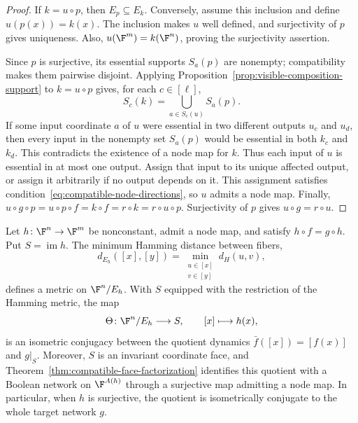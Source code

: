 \begin{proof}
If $k=u\circ p$, then $E_p\subseteq E_k$. Conversely, assume this inclusion and define $u(p(x))=k(x)$. The inclusion makes $u$ well defined, and surjectivity of $p$ gives uniqueness. Also, $u(\F^m)=k(\F^n)$, proving the surjectivity assertion.

Since $p$ is surjective, its essential supports $S_a(p)$ are nonempty; compatibility makes them pairwise disjoint. Applying Proposition~\ref{prop:visible-composition-support} to $k=u\circ p$ gives, for each $c\in[\ell]$,
\[
    S_c(k)=\bigcup_{a\in S_c(u)}S_a(p).
\]
If some input coordinate $a$ of $u$ were essential in two different outputs $u_c$ and $u_d$, then every input in the nonempty set $S_a(p)$ would be essential in both $k_c$ and $k_d$. This contradicts the existence of a node map for $k$. Thus each input of $u$ is essential in at most one output. Assign that input to its unique affected output, or assign it arbitrarily if no output depends on it. This assignment satisfies condition~\eqref{eq:compatible-node-directions}, so $u$ admits a node map.
Finally, $u\circ g\circ p=u\circ p\circ f=k\circ f=r\circ k=r\circ u\circ p$. Surjectivity of $p$ gives $u\circ g=r\circ u$.
\end{proof}


\begin{theorem}\label{thm:first-node-homomorphism}
Let $h\colon\F^n\to\F^m$ be nonconstant, admit a node map, and satisfy $h\circ f=g\circ h$. Put $S=\operatorname{im}h$. The minimum Hamming distance between fibers,
\[
    d_{E_h}([x],[y])
    =\min_{\substack{u\in[x]\\v\in[y]}}d_H(u,v),
\]
defines a metric on $\F^n/E_h$. With $S$ equipped with the restriction of the Hamming metric, the map
\[
    \Theta\colon\F^n/E_h\longrightarrow S,
    \qquad [x]\longmapsto h(x),
\]
is an isometric conjugacy between the quotient dynamics $\bar f([x])=[f(x)]$ and $g|_S$. Moreover, $S$ is an invariant coordinate face, and Theorem~\ref{thm:compatible-face-factorization} identifies this quotient with a Boolean network on $\F^{A(h)}$ through a surjective map admitting a node map. In particular, when $h$ is surjective, the quotient is isometrically conjugate to the whole target network $g$.
\end{theorem}

